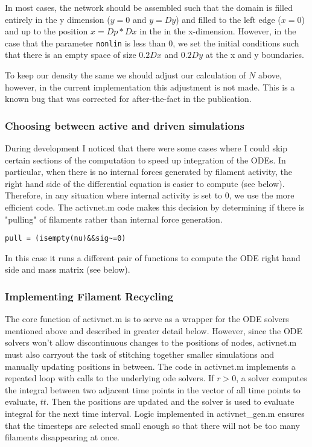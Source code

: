 In most cases, the network should be assembled such that the domain is filled entirely in the y dimension ($y=0$ and $y=Dy$) and filled to the left edge ($x=0$) and up to the position $x=Dp*Dx$ in the in the x-dimension.  However, in the case that the parameter \texttt{nonlin} is less than 0, we set the initial conditions such that there is an empty space of size $0.2 Dx$ and $0.2 Dy$ at the x and y boundaries.  

To keep our density the same we should adjust our calculation of $N$ above, however, in the current implementation this adjustment is not made. This is a known bug that was corrected for after-the-fact in the publication. 


\subsubsection{Choosing between active and driven simulations }

During development I noticed that there were some cases where I could skip certain sections of the computation to speed up integration of the ODEs.  In particular, when there is no internal forces generated by filament activity, the right hand side of the differential equation is easier to compute (see below).  Therefore, in any situation where internal activity is set to 0, we use the more efficient code.  The activnet.m code makes this decision by determining if there is "pulling" of filaments rather than internal force generation.  

\begin{verbatim}
pull = (isempty(nu)&&sig~=0) 
\end{verbatim}

In this case it runs a different pair of functions to compute the ODE right hand side and mass matrix (see below).

\subsubsection{Implementing Filament Recycling }

The core function of activnet.m is to serve as a wrapper for the ODE solvers mentioned above and described in greater detail below.  However, since the ODE solvers won't allow discontinuous changes to the positions of nodes, activnet.m must also carryout the task of stitching together smaller simulations and manually updating positions in between.  The code in activnet.m implements a repeated loop with calls to the underlying ode solvers. If $r>0$, a solver computes the integral between two adjacent time points in the vector of all time points to evaluate, $tt$. Then the positions are updated and the solver is used to evaluate integral for the next time interval. Logic implemented in activnet\_gen.m ensures that the timesteps are selected small enough so that there will not be too many filaments disappearing at once.

